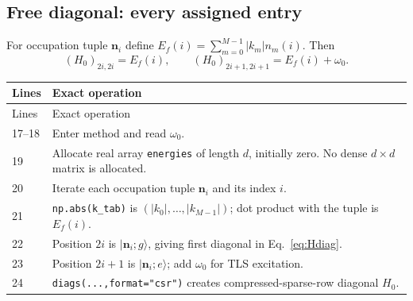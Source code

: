 \documentclass[11pt,a4paper]{article}
\newcommand{\ket}[1]{\lvert #1\rangle}
\newcommand{\code}[1]{\nolinkurl{#1}}
\begin{document}
\subsection{Free diagonal: every assigned entry}

For occupation tuple $\mathbf n_i$ define
$E_f(i)=\sum_{m=0}^{M-1}|k_m|n_m(i)$.
Then
\begin{equation}
(H_0)_{2i,2i}=E_f(i),\qquad
(H_0)_{2i+1,2i+1}=E_f(i)+\omega_0.
\label{eq:Hdiag}
\end{equation}
\begin{longtable}{p{}p{}}
\toprule Lines & Exact operation\\\midrule\endfirsthead
\toprule Lines & Exact operation\\\midrule\endhead
17--18 & Enter method and read $\omega_0$.\\
19 & Allocate real array \code{energies} of length $d$, initially zero. No dense $d\times d$ matrix is allocated.\\
20 & Iterate each occupation tuple $\mathbf n_i$ and its index $i$.\\
21 & \code{np.abs(k_tab)} is $(|k_0|,\ldots,|k_{M-1}|)$; dot product with the tuple is $E_f(i)$.\\
22 & Position $2i$ is $\ket{\mathbf n_i;g}$, giving first diagonal in Eq.~\eqref{eq:Hdiag}.\\
23 & Position $2i+1$ is $\ket{\mathbf n_i;e}$; add $\omega_0$ for TLS excitation.\\
24 & \code{diags(...,format="csr")} creates compressed-sparse-row diagonal $H_0$.\\
\bottomrule
\end{longtable}
\end{document}
